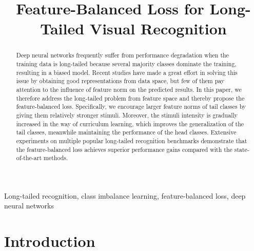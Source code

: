\documentclass{article}
\begin{document}
\sloppy

\def\x{{\mathbf x}}
\def\L{{\cal L}}


\title{Feature-Balanced Loss for Long-Tailed Visual Recognition}

\address{Department of Computer Science, Hong Kong Baptist University, Hong Kong \\
{\tt\small \{csmkli, ymc, csjyjiang\}@comp.hkbu.edu.hk}}
\maketitle

\begin{abstract}
Deep neural networks frequently suffer from performance degradation when the training data is long-tailed because several majority classes dominate the training, resulting in a biased model. Recent studies have made a great effort in solving this issue by obtaining good representations from data space, but few of them pay attention to the influence of feature norm on the predicted results. In this paper, we therefore address the long-tailed problem from feature space and thereby propose the feature-balanced loss. Specifically, we encourage larger feature norms of tail classes by giving them relatively stronger stimuli. Moreover, the stimuli intensity is gradually increased in the way of curriculum learning, which improves the generalization of the tail classes, meanwhile maintaining the performance of the head classes. Extensive experiments on multiple popular long-tailed recognition benchmarks demonstrate that the feature-balanced loss achieves superior performance gains compared with the state-of-the-art methods.
\end{abstract}


\begin{keywords}
Long-tailed recognition, class imbalance learning, feature-balanced loss, deep neural networks
\end{keywords}
\section{Introduction}
\label{sec:intro}
\end{document}
